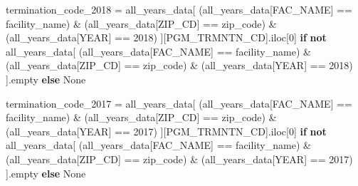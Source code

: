 \documentclass[
  letterpaper,
  DIV=11,
  numbers=noendperiod]{scrartcl}
\newenvironment{Shaded}{\begin{snugshade}}{\end{snugshade}}
\newcommand{\ControlFlowTok}[1]{\textcolor[rgb]{0.00,0.23,0.31}{\textbf{#1}}}
\newcommand{\DecValTok}[1]{\textcolor[rgb]{0.68,0.00,0.00}{#1}}
\newcommand{\KeywordTok}[1]{\textcolor[rgb]{0.00,0.23,0.31}{\textbf{#1}}}
\newcommand{\NormalTok}[1]{\textcolor[rgb]{0.00,0.23,0.31}{#1}}
\newcommand{\OperatorTok}[1]{\textcolor[rgb]{0.37,0.37,0.37}{#1}}
\newcommand{\StringTok}[1]{\textcolor[rgb]{0.13,0.47,0.30}{#1}}
\newcommand{\VariableTok}[1]{\textcolor[rgb]{0.07,0.07,0.07}{#1}}
\begin{document}
\begin{Shaded}
\begin{Highlighting}[]
\NormalTok{    termination\_code\_2018 }\OperatorTok{=}\NormalTok{ all\_years\_data[}
\NormalTok{        (all\_years\_data[}\StringTok{\textquotesingle{}FAC\_NAME\textquotesingle{}}\NormalTok{] }\OperatorTok{==}\NormalTok{ facility\_name) }\OperatorTok{\&}
\NormalTok{        (all\_years\_data[}\StringTok{\textquotesingle{}ZIP\_CD\textquotesingle{}}\NormalTok{] }\OperatorTok{==}\NormalTok{ zip\_code) }\OperatorTok{\&}
\NormalTok{        (all\_years\_data[}\StringTok{\textquotesingle{}YEAR\textquotesingle{}}\NormalTok{] }\OperatorTok{==} \DecValTok{2018}\NormalTok{)}
\NormalTok{    ][}\StringTok{\textquotesingle{}PGM\_TRMNTN\_CD\textquotesingle{}}\NormalTok{].iloc[}\DecValTok{0}\NormalTok{] }\ControlFlowTok{if} \KeywordTok{not}\NormalTok{ all\_years\_data[}
\NormalTok{        (all\_years\_data[}\StringTok{\textquotesingle{}FAC\_NAME\textquotesingle{}}\NormalTok{] }\OperatorTok{==}\NormalTok{ facility\_name) }\OperatorTok{\&}
\NormalTok{        (all\_years\_data[}\StringTok{\textquotesingle{}ZIP\_CD\textquotesingle{}}\NormalTok{] }\OperatorTok{==}\NormalTok{ zip\_code) }\OperatorTok{\&}
\NormalTok{        (all\_years\_data[}\StringTok{\textquotesingle{}YEAR\textquotesingle{}}\NormalTok{] }\OperatorTok{==} \DecValTok{2018}\NormalTok{)}
\NormalTok{    ].empty }\ControlFlowTok{else} \VariableTok{None}

\NormalTok{    termination\_code\_2017 }\OperatorTok{=}\NormalTok{ all\_years\_data[}
\NormalTok{        (all\_years\_data[}\StringTok{\textquotesingle{}FAC\_NAME\textquotesingle{}}\NormalTok{] }\OperatorTok{==}\NormalTok{ facility\_name) }\OperatorTok{\&}
\NormalTok{        (all\_years\_data[}\StringTok{\textquotesingle{}ZIP\_CD\textquotesingle{}}\NormalTok{] }\OperatorTok{==}\NormalTok{ zip\_code) }\OperatorTok{\&}
\NormalTok{        (all\_years\_data[}\StringTok{\textquotesingle{}YEAR\textquotesingle{}}\NormalTok{] }\OperatorTok{==} \DecValTok{2017}\NormalTok{)}
\NormalTok{    ][}\StringTok{\textquotesingle{}PGM\_TRMNTN\_CD\textquotesingle{}}\NormalTok{].iloc[}\DecValTok{0}\NormalTok{] }\ControlFlowTok{if} \KeywordTok{not}\NormalTok{ all\_years\_data[}
\NormalTok{        (all\_years\_data[}\StringTok{\textquotesingle{}FAC\_NAME\textquotesingle{}}\NormalTok{] }\OperatorTok{==}\NormalTok{ facility\_name) }\OperatorTok{\&}
\NormalTok{        (all\_years\_data[}\StringTok{\textquotesingle{}ZIP\_CD\textquotesingle{}}\NormalTok{] }\OperatorTok{==}\NormalTok{ zip\_code) }\OperatorTok{\&}
\NormalTok{        (all\_years\_data[}\StringTok{\textquotesingle{}YEAR\textquotesingle{}}\NormalTok{] }\OperatorTok{==} \DecValTok{2017}\NormalTok{)}
\NormalTok{    ].empty }\ControlFlowTok{else} \VariableTok{None}
    

\end{Highlighting}
\end{Shaded}
\end{document}
